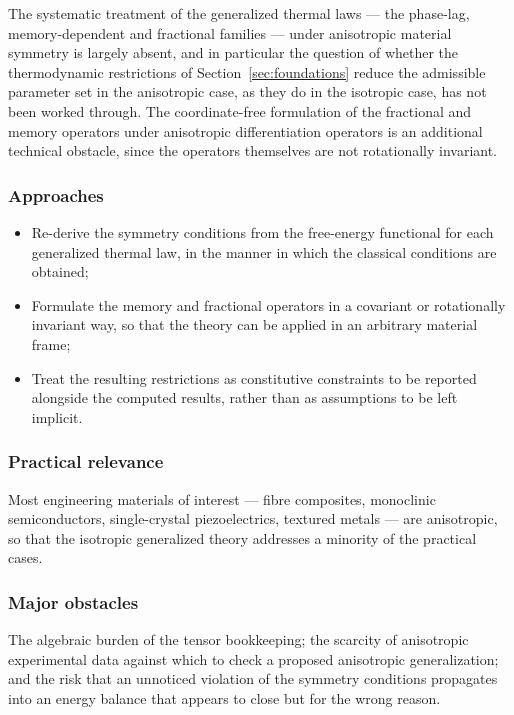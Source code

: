 The systematic treatment of the generalized thermal laws --- the phase-lag, memory-dependent and fractional families --- under anisotropic material symmetry is largely absent, and in particular the question of whether the thermodynamic restrictions of Section~\ref{sec:foundations} reduce the admissible parameter set in the anisotropic case, as they do in the isotropic case, has not been worked through. The coordinate-free formulation of the fractional and memory operators under anisotropic differentiation operators is an additional technical obstacle, since the operators themselves are not rotationally invariant.

\subsubsection{Approaches}

\begin{itemize}
\item Re-derive the symmetry conditions from the free-energy functional for each generalized thermal law, in the manner in which the classical conditions are obtained;
\item Formulate the memory and fractional operators in a covariant or rotationally invariant way, so that the theory can be applied in an arbitrary material frame;
\item Treat the resulting restrictions as constitutive constraints to be reported alongside the computed results, rather than as assumptions to be left implicit.
\end{itemize}

\subsubsection{Practical relevance}

Most engineering materials of interest --- fibre composites, monoclinic semiconductors, single-crystal piezoelectrics, textured metals --- are anisotropic, so that the isotropic generalized theory addresses a minority of the practical cases.

\subsubsection{Major obstacles}

The algebraic burden of the tensor bookkeeping; the scarcity of anisotropic experimental data against which to check a proposed anisotropic generalization; and the risk that an unnoticed violation of the symmetry conditions propagates into an energy balance that appears to close but for the wrong reason.

